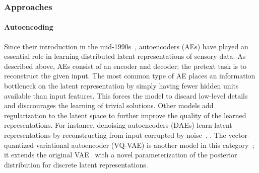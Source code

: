\subsubsection{Approaches}

\paragraph{Autoencoding} 
Since their introduction in the mid-1990s~\parencite{hinton_autoencoders_1994}, autoencoders (AEs)
have played an essential role in learning distributed latent representations of
sensory data. 
As described above, AEs consist of an encoder and decoder; the pretext task
is to reconstruct the given input. The most common type of AE places an
information bottleneck on the latent representation by simply having fewer
hidden units available than input features. This forces the model to discard
low-level details and disccourages the learning of trivial solutions. Other models add
regularization to the latent space to further improve the quality of the
learned representations.
For instance, denoising autoencoders (DAEs) learn latent representations by
reconstructing from input corrupted by noise~\parencite{vincent_stacked_2010}. 
.
The vector-quantized variational autoencoder (VQ-VAE) is another model in this
category~\parencite{oord_neural_2018};
it extends the original VAE~\parencite{kingma_autoencoding_2014} with a novel
parameterization of the posterior distribution for discrete latent
representations. 



